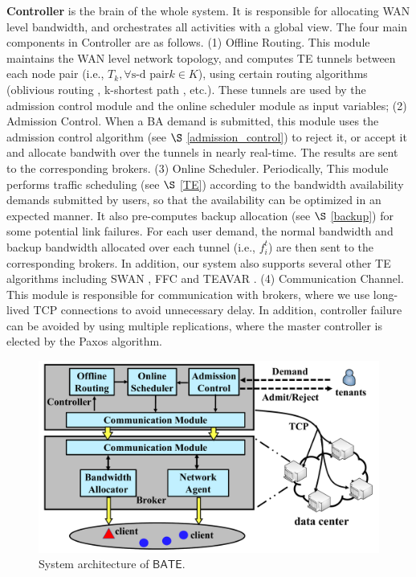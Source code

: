 \documentclass[sigconf]{acmart}
\begin{document}
\textbf{Controller} is the brain of the whole system. It is responsible for allocating WAN level bandwidth, and orchestrates all activities with a global view. The four main components in Controller are as follows.
(1) Offline Routing.
This module maintains the WAN level network topology, and computes TE tunnels between each node pair
 (i.e., $T_k,\forall \text{s-d pair} k \in K$), using certain routing algorithms (oblivious routing \cite{SMORE}, k-shortest path \cite{swan}, etc.). 
These tunnels are used by the admission control module and the online scheduler module as input variables;
(2) Admission Control.
When a BA demand is submitted, this module uses the admission control algorithm (see $\S$ \ref{admission_control}) to reject it, or accept it and allocate bandwith over the tunnels in nearly real-time.
The results are sent to the corresponding brokers.
(3) Online Scheduler. 
Periodically, This module performs traffic scheduling (see $\S$ \ref{TE}) according to the bandwidth availability demands submitted by users, so that the availability can be optimized in an expected manner. 
It also pre-computes backup allocation (see $\S$ \ref{backup}) for some potential link failures.
For each user demand, the normal bandwidth and backup bandwidth allocated over each tunnel (i.e., $f_i^t$) are then sent to the corresponding brokers. 
In addition, our system also supports several other TE algorithms including SWAN \cite{swan}, FFC \cite{FFC} and TEAVAR \cite{TEAVAR}.
(4) Communication Channel.
This module is responsible for communication with brokers, where we use long-lived TCP connections to avoid unnecessary delay. 
In addition, controller failure can be avoided by using multiple replications, 
where the master controller is elected by the Paxos \cite{lamport1998the} algorithm.

\begin{figure}
\begin{center}
\includegraphics [width=0.9\columnwidth] {fig/inter-DC-WAN-V3.pdf}
\caption{System architecture of $\mathsf{BATE}$.}
\label{pic-overview}
\end{center}
\end{figure}
\end{document}
